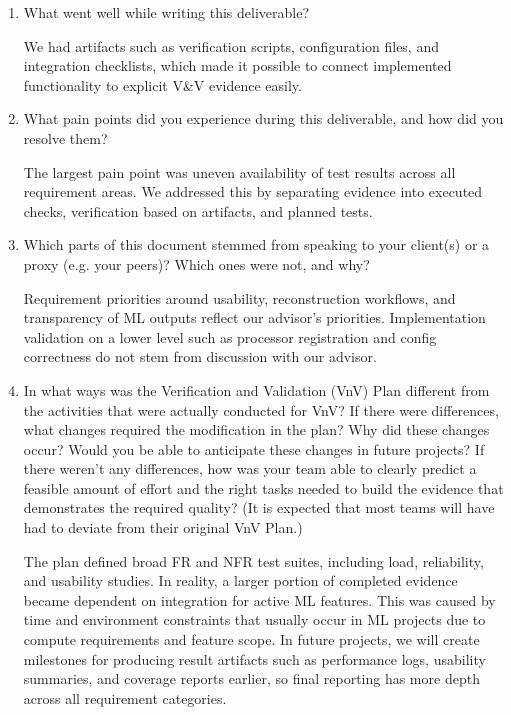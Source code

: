 \documentclass[12pt, titlepage]{article}
\begin{document}
\begin{enumerate}
  \item What went well while writing this deliverable?

  We had artifacts such as verification scripts, configuration files, and integration checklists, which made it possible to connect implemented functionality to explicit V\&V evidence easily.

  \item What pain points did you experience during this deliverable, and how
    did you resolve them?

  The largest pain point was uneven availability of test results across all requirement areas. We addressed this by separating evidence into executed checks, verification based on artifacts, and planned tests.

  \item Which parts of this document stemmed from speaking to your client(s) or
  a proxy (e.g. your peers)? Which ones were not, and why?

  Requirement priorities around usability, reconstruction workflows, and transparency of ML outputs reflect our advisor's priorities. Implementation validation on a lower level such as processor registration and config correctness do not stem from discussion with our advisor.

  \item In what ways was the Verification and Validation (VnV) Plan different
  from the activities that were actually conducted for VnV? If there were
  differences, what changes required the modification in the plan? Why did
  these changes occur? Would you be able to anticipate these changes in future
  projects? If there weren't any differences, how was your team able to clearly
  predict a feasible amount of effort and the right tasks needed to build the
  evidence that demonstrates the required quality? (It is expected that most
  teams will have had to deviate from their original VnV Plan.)

  The plan defined broad FR and NFR test suites, including load, reliability, and usability studies. In reality, a larger portion of completed evidence became dependent on integration for active ML features. This was caused by time and environment constraints that usually occur in ML projects due to compute requirements and feature scope. In future projects, we will create milestones for producing result artifacts such as performance logs, usability summaries, and coverage reports earlier, so final reporting has more depth across all requirement categories.
\end{enumerate}
\end{document}
